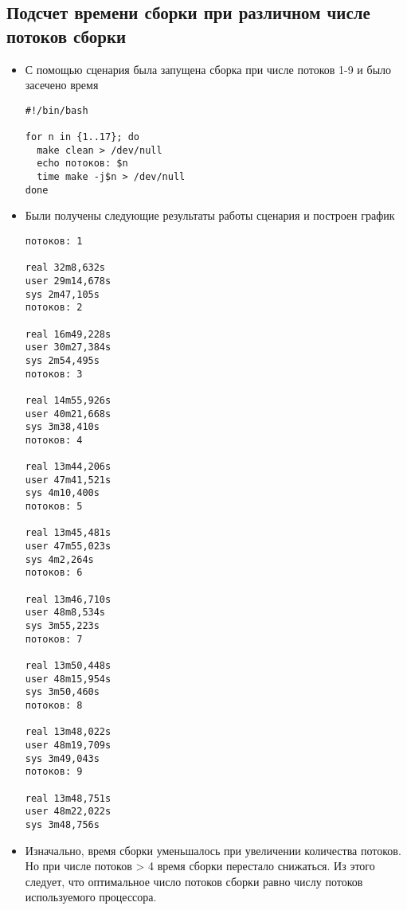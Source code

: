 \documentclass[a4paper]{article}
\begin{document}
    \subsection{Подсчет времени сборки при различном числе потоков сборки}
    \begin{itemize}
        \item С помощью сценария была запущена сборка при числе потоков
        1-9 и было засечено время
        \begin{verbatim}
#!/bin/bash

for n in {1..17}; do
  make clean > /dev/null
  echo потоков: $n
  time make -j$n > /dev/null
done
        \end{verbatim}
        \item Были получены следующие результаты работы сценария и построен график
        \begin{verbatim}
потоков: 1

real 32m8,632s
user 29m14,678s
sys 2m47,105s
потоков: 2

real 16m49,228s
user 30m27,384s
sys 2m54,495s
потоков: 3

real 14m55,926s
user 40m21,668s
sys 3m38,410s
потоков: 4

real 13m44,206s
user 47m41,521s
sys 4m10,400s
потоков: 5

real 13m45,481s
user 47m55,023s
sys 4m2,264s
потоков: 6

real 13m46,710s
user 48m8,534s
sys 3m55,223s
потоков: 7

real 13m50,448s
user 48m15,954s
sys 3m50,460s
потоков: 8

real 13m48,022s
user 48m19,709s
sys 3m49,043s
потоков: 9

real 13m48,751s
user 48m22,022s
sys 3m48,756s
        \end{verbatim}

        \item Изначально, время сборки уменьшалось при увеличении количества потоков.
        Но при числе потоков > 4 время сборки перестало снижаться. Из этого следует, что оптимальное
        число потоков сборки равно числу потоков используемого процессора.
    \end{itemize}
\end{document}
